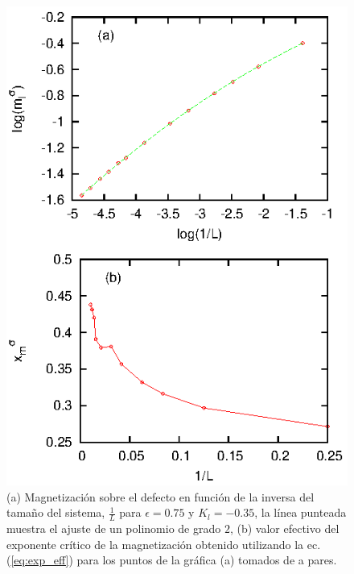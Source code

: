 \begin{figure}[htbp!]
\begin{center}
\includegraphics[width=\figwidth]{graf/exp/mag_exp_e0.75_Jln0.35.eps}
\end{center}
\caption{(a) Magnetizaci\'on sobre el defecto en funci\'on de la inversa del tamaño del sistema, $\frac{1}{L}$ para
 $\epsilon=0.75$ y $K_{l}=-0.35$, la l\'inea punteada muestra el ajuste de un polinomio de grado $2$, (b) valor efectivo
  del exponente cr\'itico de la magnetizaci\'on obtenido utilizando la ec.(\ref{eq:exp_eff})
 para los puntos de la gr\'afica (a) tomados de a pares.}
\label{fig:xfits}
\end{figure}

